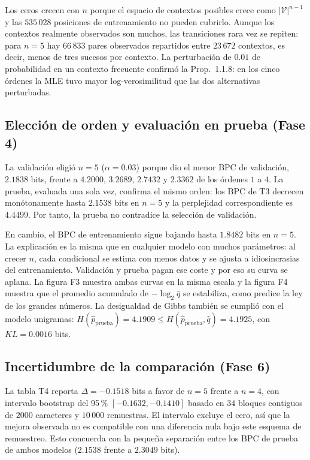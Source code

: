 \documentclass[11pt,letterpaper]{article}
\begin{document}
Los ceros crecen con $n$ porque el espacio de contextos posibles crece como
$\vert\mathcal{V}\vert^{n-1}$ y las $535\,028$ posiciones de entrenamiento no
pueden cubrirlo. Aunque los contextos realmente observados son muchos, las
transiciones rara vez se repiten: para $n=5$ hay $66\,833$ pares observados
repartidos entre $23\,672$ contextos, es decir, menos de tres sucesos por
contexto. La perturbación de $0.01$ de probabilidad en un contexto frecuente
confirmó la Prop.\ 1.1.8: en los cinco órdenes la MLE tuvo mayor
log-verosimilitud que las dos alternativas perturbadas.

\subsection{Elección de orden y evaluación en prueba (Fase 4)}

La validación eligió $n=5$ ($\alpha=0.03$) porque dio el menor BPC de
validación, $2.1838$ bits, frente a $4.2000$, $3.2689$, $2.7432$ y $2.3362$ de
los órdenes $1$ a $4$. La prueba, evaluada una sola vez, confirma el mismo
orden: los BPC de T3 decrecen monótonamente hasta $2.1538$ bits en $n=5$ y la
perplejidad correspondiente es $4.4499$. Por tanto, la prueba no contradice la
selección de validación.

En cambio, el BPC de entrenamiento sigue bajando hasta $1.8482$ bits en $n=5$.
La explicación es la misma que en cualquier modelo con muchos parámetros: al
crecer $n$, cada condicional se estima con menos datos y se ajusta a
idiosincrasias del entrenamiento. Validación y prueba pagan ese coste y por eso
su curva se aplana. La figura F3 muestra ambas curvas en la misma escala y la
figura F4 muestra que el promedio acumulado de $-\log_2\hat q$ se estabiliza,
como predice la ley de los grandes números. La desigualdad de Gibbs también se
cumplió con el modelo unigramas: $H(\hat p_{\mathrm{prueba}})=4.1909\le
H(\hat p_{\mathrm{prueba}},\hat q)=4.1925$, con $KL=0.0016$ bits.

\subsection{Incertidumbre de la comparación (Fase 6)}

La tabla T4 reporta $\Delta=-0.1518$ bits a favor de $n=5$ frente a $n=4$, con
intervalo bootstrap del 95\,\% $[-0.1632,-0.1410]$ basado en $34$ bloques
contiguos de $2000$ caracteres y $10\,000$ remuestras. El intervalo excluye el
cero, así que la mejora observada no es compatible con una diferencia nula bajo
este esquema de remuestreo. Esto concuerda con la pequeña separación entre los
BPC de prueba de ambos modelos ($2.1538$ frente a $2.3049$ bits).
\end{document}
